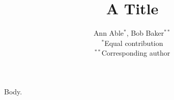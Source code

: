 \documentclass{article}
\begin{document}
\title{A Title}
\author{Ann Able$^{*}$, Bob Baker$^{**}$\\ $^*$Equal contribution\\ $^{**}$Corresponding author}
\maketitle
Body.
\end{document}
